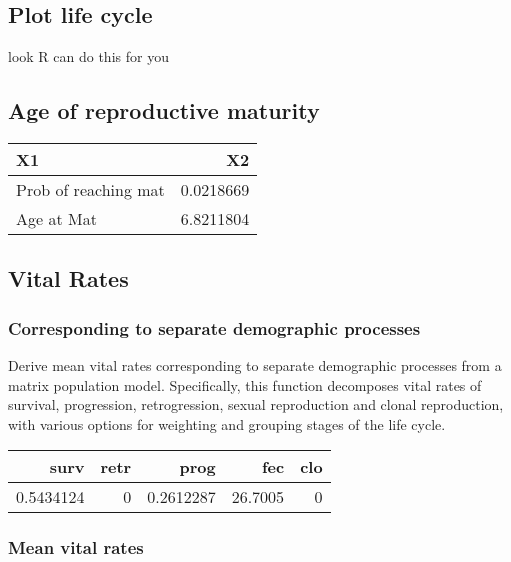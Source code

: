 \documentclass[
]{article}
\begin{document}
\newpage

\hypertarget{plot-life-cycle}{%
\subsection{Plot life cycle}\label{plot-life-cycle}}

look R can do this for you

\hypertarget{age-of-reproductive-maturity}{%
\subsection{Age of reproductive
maturity}\label{age-of-reproductive-maturity}}

\begin{tabular}{lr}
\toprule
X1 & X2\\
\midrule
Prob of reaching mat & 0.0218669\\
Age at Mat & 6.8211804\\
\bottomrule
\end{tabular}

\hypertarget{vital-rates}{%
\subsection{Vital Rates}\label{vital-rates}}

\hypertarget{corresponding-to-separate-demographic-processes}{%
\subsubsection{Corresponding to separate demographic
processes}\label{corresponding-to-separate-demographic-processes}}

Derive mean vital rates corresponding to separate demographic processes
from a matrix population model. Specifically, this function decomposes
vital rates of survival, progression, retrogression, sexual reproduction
and clonal reproduction, with various options for weighting and grouping
stages of the life cycle.

\begin{tabular}{rrrrr}
\toprule
surv & retr & prog & fec & clo\\
\midrule
0.5434124 & 0 & 0.2612287 & 26.7005 & 0\\
\bottomrule
\end{tabular}

\hypertarget{mean-vital-rates}{%
\subsubsection{Mean vital rates}\label{mean-vital-rates}}
\end{document}
